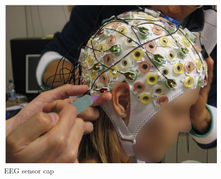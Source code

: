 \documentclass{beamer}
\begin{document}
\begin{frame}
\begin{columns}
		\begin{figure}[ht]
			\centering
			\includegraphics[width=1\textwidth, trim={3.5cm 1cm 1cm 1cm},clip]{images/eegelectrodes.png}
			\caption{EEG sensor cap}
		\end{figure}
	\end{columns}
	


\end{frame}


%
\end{document}
